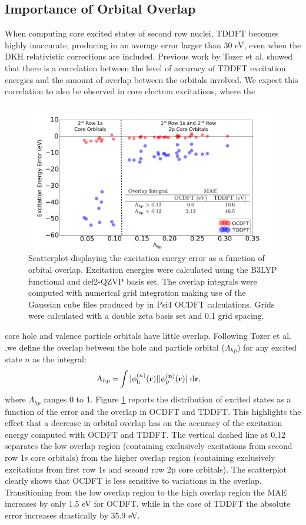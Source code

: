 \documentclass[12pt]{article}
\begin{document}
\subsection{Importance of Orbital Overlap}
When computing core excited states of second row nuclei, TDDFT becomes highly inaccurate, producing in an average error larger than 30 eV, even when the DKH relativistic corrections are included. Previous work by Tozer et al.\cite{peach_excitation_2008}  showed that there is a correlation between the level of accuracy of TDDFT excitation energies and the amount of overlap between the orbitals involved. We expect this correlation to also be observed in core electron excitations, where the
\begin{figure}[ht]
\includegraphics[scale=0.30]{scatterNEW.pdf}
\caption{Scatterplot displaying the excitation energy error as a function of orbital overlap. Excitation energies were calculated using the B3LYP functional and def2-QZVP basis set. The overlap integrals were computed with numerical grid integration making use of the Gaussian cube files produced by in Psi4 OCDFT calculations. Grids were calculated with a double zeta basis set and 0.1 grid spacing.}
\label{figure:scatter}
\end{figure}
core hole and valence particle orbitals have little overlap. Following Tozer et al.\cite{peach_excitation_2008} ,we define the overlap between the hole and particle orbital ($\Lambda_{hp}$) for any excited state $n$ as the integral:
\begin{align}
\Lambda_{hp} = &\int |\phi^{(n)}_{\rm h} (\bf{r})||\phi^{(n)}_{\rm p} (\bf{r})| \ \rm d\bf{r} ,
\end{align}
where $\Lambda_{hp}$ ranges 0 to 1. Figure \ref{figure:scatter} reports the distribution of excited states as a function of the error and the overlap in OCDFT and TDDFT. This highlights the effect that a decrease in orbital overlap has on the accuracy of the excitation energy computed with OCDFT and TDDFT. The vertical dashed line at 0.12 separates the low overlap region (containing exclusively excitations from second row 1s core orbitals) from the higher overlap region (containing exclusively excitations from first row 1s and second row 2p core orbitals). The scatterplot clearly shows that OCDFT is less sensitive to variations in the overlap. Transitioning from the low overlap region to the high overlap region the MAE increases by only 1.5 eV for OCDFT, while in the case of TDDFT the absolute error increases drastically by 35.9 eV.\\
\end{document}
